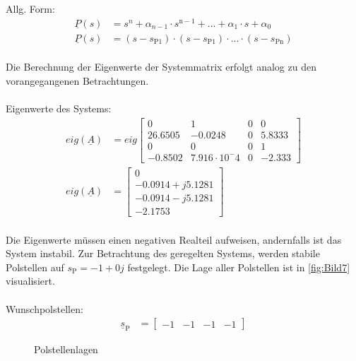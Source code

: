 \documentclass[
	pagesize,
	fontsize=12pt,
	paper=a4,
	oneside,
   reqno
]{scrartcl}
\begin{document}
Allg. Form:
\begin{align*}
        \underline{P}(s) &= s^n+\alpha_{n-1}\cdot s^{\mathrm{n-1}}+...+\alpha_{\mathrm{1}}\cdot s + \alpha_{\mathrm{0}} \\
        \underline{P}(s) &= (s-s_{\mathrm{P1}})\cdot(s-s_{\mathrm{P1}})\cdot ... \cdot (s-s_{\mathrm{Pn}})
\end{align*}\\
Die Berechnung der Eigenwerte der Systemmatrix erfolgt analog zu den vorangegangenen Betrachtungen.\\\\
Eigenwerte des Systems:
\begin{align}
    eig(\underline{A}) &= eig
    \begin{bmatrix}
        0 & 1 & 0 & 0 \\
        26.6505 & -0.0248 & 0 & 5.8333 \\
        0 & 0 & 0 & 1 \\
        -0.8502 & 7.916\cdot10^-4 & 0 & -2.333
    \end{bmatrix} \nonumber\\
    eig(\underline{A}) &=
    \begin{bmatrix}
        0 \\
        -0.0914 + j 5.1281 \\
        -0.0914 - j 5.1281 \\
        -2.1753
    \end{bmatrix}
\end{align}\\
Die Eigenwerte müssen einen negativen Realteil aufweisen, andernfalls ist das System instabil. Zur Betrachtung des geregelten Systems, werden stabile Polstellen auf $s_{\mathrm{P}} = -1+0j$ festgelegt. Die Lage aller Polstellen ist in \autoref{fig:Bild7} visualisiert.\\\\
Wunschpolstellen:
\begin{align}
    \underline{s}_{\mathrm{P}} &= 
    \begin{bmatrix}
        -1 & -1 & -1 & -1 
    \end{bmatrix}
\end{align}
\begin{figure}[H]
    \centering
    \caption[Polstellenlage]{Polstellenlagen}
    \label{fig:Bild7}
\end{figure}
\end{document}
